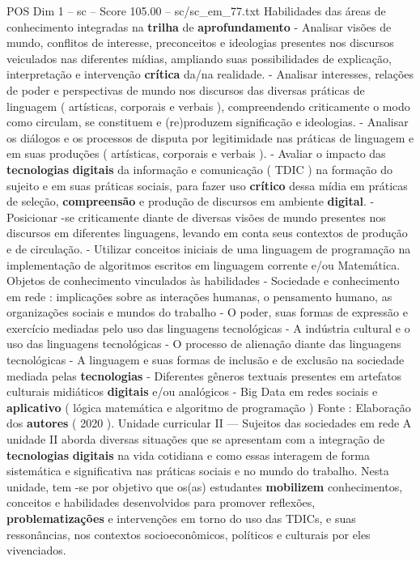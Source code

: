 \begin{textsample}{POS Dim 1 – sc – Score 105.00 – sc/sc\_em\_77.txt}
Habilidades das áreas de conhecimento integradas na \textbf{trilha} de \textbf{aprofundamento} - Analisar visões de mundo, conflitos de interesse, preconceitos e ideologias presentes nos discursos veiculados nas diferentes mídias, ampliando suas possibilidades de explicação, interpretação e intervenção \textbf{crítica} da/na realidade. - Analisar interesses, relações de poder e perspectivas de mundo nos discursos das diversas práticas de linguagem ( artísticas, corporais e verbais ), compreendendo criticamente o modo como circulam, se constituem e (re)produzem significação e ideologias. - Analisar os diálogos e os processos de disputa por legitimidade nas práticas de linguagem e em suas produções ( artísticas, corporais e verbais ). - Avaliar o impacto das \textbf{tecnologias} \textbf{digitais} da informação e comunicação ( TDIC ) na formação do sujeito e em suas práticas sociais, para fazer uso \textbf{crítico} dessa mídia em práticas de seleção, \textbf{compreensão} e produção de discursos em ambiente \textbf{digital}. - Posicionar -se criticamente diante de diversas visões de mundo presentes nos discursos em diferentes linguagens, levando em conta seus contextos de produção e de circulação. - Utilizar conceitos iniciais de uma linguagem de programação na implementação de algoritmos escritos em linguagem corrente e/ou Matemática.
Objetos de conhecimento vinculados às habilidades - Sociedade e conhecimento em rede : implicações sobre as interações humanas, o pensamento humano, as organizações sociais e mundos do trabalho - O poder, suas formas de expressão e exercício mediadas pelo uso das linguagens tecnológicas - A indústria cultural e o uso das linguagens tecnológicas - O processo de alienação diante das linguagens tecnológicas - A linguagem e suas formas de inclusão e de exclusão na sociedade mediada pelas \textbf{tecnologias} - Diferentes gêneros textuais presentes em artefatos culturais midiáticos \textbf{digitais} e/ou analógicos - Big Data em redes sociais e \textbf{aplicativo} ( lógica matemática e algoritmo de programação ) Fonte : Elaboração dos \textbf{autores} ( 2020 ).
Unidade curricular II — Sujeitos das sociedades em rede A unidade II aborda diversas situações que se apresentam com a integração de \textbf{tecnologias} \textbf{digitais} na vida cotidiana e como essas interagem de forma sistemática e significativa nas práticas sociais e no mundo do trabalho.
Nesta unidade, tem -se por objetivo que os(as) estudantes \textbf{mobilizem} conhecimentos, conceitos e habilidades desenvolvidos para promover reflexões, \textbf{problematizações} e intervenções em torno do uso das TDICs, e suas ressonâncias, nos contextos socioeconômicos, políticos e culturais por eles vivenciados.

\end{textsample}

